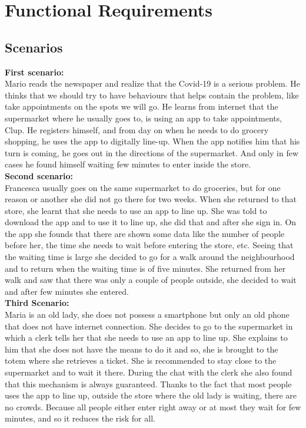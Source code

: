\section{Functional Requirements}

\subsection{Scenarios}

\textbf{First scenario:}\\
Mario reads the newspaper and realize that the Covid-19 is a serious problem. He thinks that we should try to have behaviours that helps contain the problem, like take appointments on the spots we will go. He learns from internet that the supermarket where he usually goes to, is using an app to take appointments, Clup. He registers himself, and from day on when he needs to do grocery shopping, he uses the app to digitally line-up. When the app notifies him that his turn is coming, he goes out in the directions of the supermarket. And only in few cases he found himself waiting few minutes to enter inside the store.\\

\textbf{Second scenario:}\\
Francesca usually goes on the same supermarket to do groceries, but for one reason or another she did not go there for two weeks. When she returned to that store, she learnt that she needs to use an app to line up. She was told to download the app and to use it to line up, she did that and after she sign in. 
On the app she founds that there are shown some data like  the number of people before her, the time she needs to wait before entering the store, etc. 
Seeing that the waiting time is large she decided to go for a walk around the neighbourhood and to return when the waiting time is of five minutes. She returned from her walk and saw that there was only a couple of people outside, she decided to wait and after few minutes she entered.\\

\textbf{Third Scenario:}\\
Maria is an old lady, she does not possess a smartphone but only an old phone that does not have internet connection.
She decides to go to the supermarket in which a clerk tells her that she needs to use an app to line up. She explains to him that she does not have the means to do it and so, she is brought to the totem where she retrieves a ticket. She is recommended to stay close to the supermarket and to wait it there. During the chat with the clerk she also found that this mechanism is always guaranteed. 
Thanks to the fact that most people uses the app to line up, outside the store where the old lady is waiting, there are no crowds. Because all people either enter right away or at most they wait for few minutes, and so it reduces the risk for all.\\

